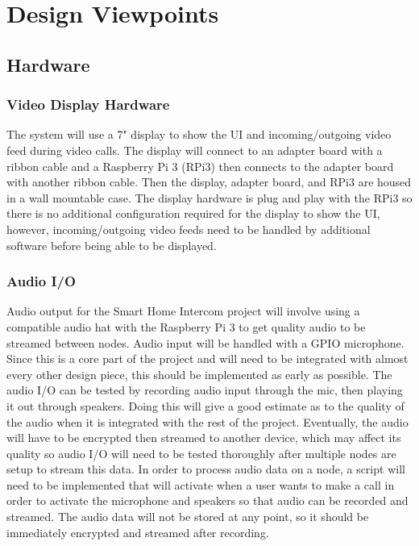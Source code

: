 \documentclass[onecolumn, draftclsnofoot,10pt, compsoc]{IEEEtran}
\begin{document}
\section{Design Viewpoints}

\subsection{Hardware}
\subsubsection{Video Display Hardware}
The system will use a 7" display to show the UI and incoming/outgoing video feed during video calls. The display will connect to an adapter board with a ribbon cable and a Raspberry Pi 3 (RPi3) then connects to the adapter board with another ribbon cable. Then the display, adapter board, and RPi3 are housed in a wall mountable case. The display hardware is plug and play with the RPi3 so there is no additional configuration required for the display to show the UI, however, incoming/outgoing video feeds need to be handled by additional software before being able to be displayed.

\subsubsection{Audio I/O}
Audio output for the Smart Home Intercom project will involve using a compatible audio hat with the Raspberry Pi 3 to get quality audio to be streamed between nodes. Audio input will be handled with a GPIO microphone. Since this is a core part of the project and will need to be integrated with almost every other design piece, this should be implemented as early as possible. The audio I/O can be tested by recording audio input through the mic, then playing it out through speakers. Doing this will give a good estimate as to the quality of the audio when it is integrated with the rest of the project. Eventually, the audio will have to be encrypted then streamed to another device, which may affect its quality so audio I/O will need to be tested thoroughly after multiple nodes are setup to stream this data. In order to process audio data on a node, a script will need to be implemented that will activate when a user wants to make a call in order to activate the microphone and speakers so that audio can be recorded and streamed. The audio data will not be stored at any point, so it should be immediately encrypted and streamed after recording.
\end{document}
